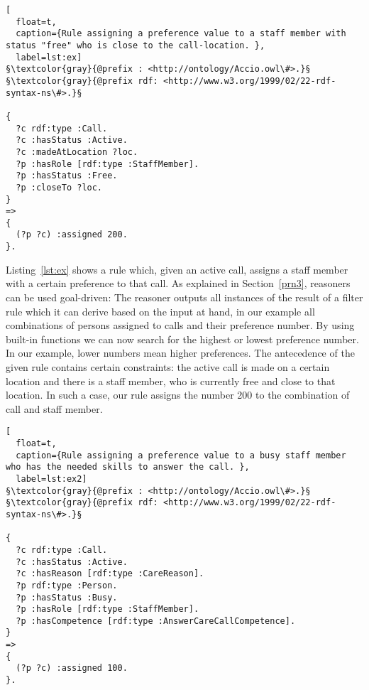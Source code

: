  \begin{lstlisting}[
  float=t,
  caption={Rule assigning a preference value to a staff member with status "free" who is close to the call-location. },
  label=lst:ex]
§\textcolor{gray}{@prefix : <http://ontology/Accio.owl\#>.}§
§\textcolor{gray}{@prefix rdf: <http://www.w3.org/1999/02/22-rdf-syntax-ns\#>.}§

{
  ?c rdf:type :Call.
  ?c :hasStatus :Active. 
  ?c :madeAtLocation ?loc. 
  ?p :hasRole [rdf:type :StaffMember].
  ?p :hasStatus :Free.
  ?p :closeTo ?loc.
}
=>
{
  (?p ?c) :assigned 200.
}.
\end{lstlisting}
 
Listing~\ref{lst:ex} shows a rule which, given an active call, assigns a staff member with a certain preference to that call. 
As explained in Section~\ref{prn3}, \nthree reasoners can be used goal-driven: The reasoner outputs all instances of the result of a filter rule which it can derive 
based on the input at hand, in our example all combinations of persons assigned to calls and their preference number. 
By using built-in functions we can now search for the highest or lowest preference number.
In our example, lower numbers mean higher preferences. The antecedence of the given rule contains certain constraints: the active call is made on a certain location and
there is a staff member, who is currently free and close to that location. In such a case, our rule assigns the number 200 to the combination of call and staff member.

\begin{lstlisting}[
  float=t,
  caption={Rule assigning a preference value to a busy staff member who has the needed skills to answer the call. },
  label=lst:ex2]
§\textcolor{gray}{@prefix : <http://ontology/Accio.owl\#>.}§
§\textcolor{gray}{@prefix rdf: <http://www.w3.org/1999/02/22-rdf-syntax-ns\#>.}§

{
  ?c rdf:type :Call.
  ?c :hasStatus :Active.
  ?c :hasReason [rdf:type :CareReason].
  ?p rdf:type :Person.
  ?p :hasStatus :Busy.
  ?p :hasRole [rdf:type :StaffMember].
  ?p :hasCompetence [rdf:type :AnswerCareCallCompetence].
}
=>
{
  (?p ?c) :assigned 100.
}.
\end{lstlisting}




